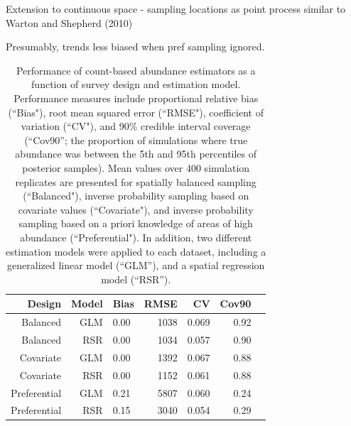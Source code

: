 \documentclass[times,mee,doublespace,]{besauth2}
\begin{document}
Extension to continuous space - sampling locations as point process similar to Warton and Shepherd (2010)

Presumably, trends less biased when pref sampling ignored.






\pagebreak

\begin{table}[ht]
\label{tab:PS}
\caption{Performance of count-based abundance estimators as a function of survey design and estimation model.  Performance measures include proportional relative bias (``Bias"), root mean squared error (``RMSE"), coefficient of variation (``CV"), and 90\% credible interval coverage (``Cov90''; the proportion of simulations where true abundance was between the 5th and 95th percentiles of posterior samples).  Mean values over 400 simulation replicates are presented for spatially balanced sampling (``Balanced"), inverse probability sampling based on covariate values (``Covariate"), and inverse probability sampling based on a priori knowledge of areas of high abundance (``Preferential"). In addition, two different estimation models were applied to each dataset, including a generalized linear model (``GLM''), and a spatial regression model (``RSR'').}
\centering
\begin{tabular}{rrlrrrr}
  \hline
 Design & Model & Bias & RMSE & CV & Cov90 \\
  \hline
Balanced & GLM & 0.00 & 1038 & 0.069 & 0.92 \\
Balanced & RSR & 0.00 & 1034 & 0.057 & 0.90 \\
Covariate & GLM & 0.00 & 1392 & 0.067 & 0.88 \\
Covariate & RSR & 0.00 & 1152 & 0.061 & 0.88 \\
Preferential & GLM & 0.21 & 5807 & 0.060 & 0.24 \\
Preferential & RSR & 0.15 & 3040 & 0.054 & 0.29 \\
   \hline
\end{tabular}
\end{table}

\pagebreak

\end{document}
